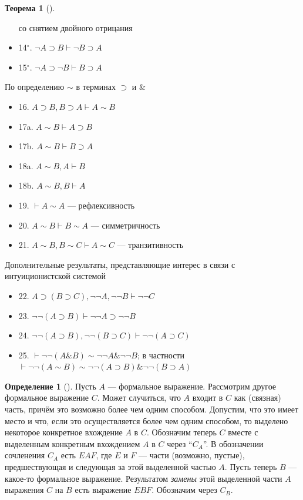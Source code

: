 \documentclass[a4paper, 12pt]{article}  %
\DeclareMathOperator{\conj}{\mathbb{\&}}
\theoremstyle{definition}
\newtheorem{theorem}{Теорема}
\newtheorem*{definition}{Определение}
\begin{document}
\begin{theorem}[]
\begin{itemize}[label={}]
			со снятием двойного отрицания
			\item 14$^{\circ}$. $\neg A \supset B \vdash \neg B \supset A$
			\item 15$^{\circ}$. $\neg A \supset \neg B \vdash B \supset A$
		\end{itemize}
	
		По определению $\sim$ в терминах $\supset$ и $\conj$
		\begin{itemize}[label={}]
			\setlength\itemsep{0pt}	
			\item 16. $A \supset B, B \supset A \vdash A \sim B$
			\item 17a. $A \sim B \vdash A \supset B$
			\item 17b. $A \sim B \vdash B \supset A$
			\item 18a. $A \sim B, A \vdash B$
			\item 18b. $A \sim B, B \vdash A$
			\item 19. $\vdash A \sim A$ --- рефлексивность
			\item 20. $A \sim B \vdash B \sim A$ --- симметричность
			\item 21. $A \sim B, B \sim C \vdash A \sim C$ --- транзитивность
		\end{itemize}
	
	
		Дополнительные результаты, представляющие интерес в связи с интуиционистской системой
		\begin{itemize}[label={}]
			\setlength\itemsep{0pt}	
			\item 22. $A \supset (B \supset C), \neg \neg A, \neg \neg B \vdash \neg \neg C$
			\item 23. $\neg \neg (A \supset B) \vdash \neg \neg A \supset \neg \neg B$
			\item 24. $\neg \neg (A \supset B), \neg \neg (B \supset C) \vdash \neg \neg (A \supset C)$
			\item 25. $\vdash \neg \neg (A \conj B) \sim \neg \neg A \conj \neg \neg B$; в частности
				$\vdash \neg \neg (A \sim B) \sim \neg \neg (A \supset B) \conj \neg \neg (B \supset A)$
		\end{itemize}
	\end{theorem}
	
	\begin{definition}[]
		Пусть $A$ --- формальное выражение. Рассмотрим другое формальное выражение $C$. Может
		случиться, что $A$ входит в $C$ как (связная) часть, причём это возможно более чем одним
		способом. Допустим, что это имеет место и что, если это осуществляется более чем одним
		способом, то выделено некоторое конкретное вхождение $A$ в $C$. Обозначим теперь $C$ вместе
		с выделенным конкретным вхождением $A$ в $C$ через ``$C_A$''. В обозначении сочленения
		$C_A$ есть $EAF$, где $E$ и $F$ --- части (возможно, пустые), предшествующая и следующая за
		этой выделенной частью $A$. Пусть теперь $B$ --- какое-то формальное выражение. Результатом
		\textit{замены} этой выделенной части $A$ выражения $C$ на $B$ есть выражение $EBF$.
		Обозначим через $C_B$. 
	\end{definition}
\end{document}
